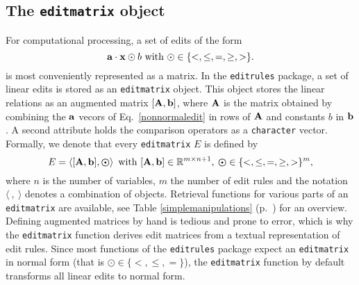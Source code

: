 \documentclass[10pt, fleqn, a4paper]{article}
\begin{document}
\subsection{The {\tt editmatrix} object}
For computational processing, a set of edits of the form 
\begin{equation}
{\bf a}\cdot{\bf x} \odot b\textrm{ with }\odot\in\{<,\leq,=,\geq,>\}.
\label{nonnormaledit}
\end{equation}
is most conveniently represented as a matrix.  In the {\tt editrules} package,
a set of linear edits is stored as an {\tt editmatrix} object.  This 
object stores the linear relations as an augmented matrix $[{\bf
A},{\bf b}]$, where $\bf A$ is the matrix obtained by combining the  ${\bf a}$
vecors of Eq.\ \eqref{nonnormaledit} in rows of $\bf A$ and constants  $b$ in $\bf b$. A
second attribute holds the comparison operators as a {\tt character} vector.
Formally, we denote that every {\tt editmatrix} $E$ is defined by
\begin{equation}
E = \left\langle [\mathbf{A},\mathbf{b}],\boldsymbol{\odot}\right\rangle 
\textrm{ with } [{\bf A},{\bf b}]\in \mathbb{R}^{m\times{n+1}},\:
\boldsymbol{\odot}\in\{<,\leq,=,\geq,>\}^{m},
\label{editset}
\end{equation}
where $n$ is the number of variables, $m$ the number of edit rules and the notation
$\langle \:,\:\rangle$ denotes a combination of objects.
Retrieval functions for various parts of an {\tt editmatrix} are available, 
see Table \ref{simplemanipulations} (p.\ \pageref{simplemanipulations}) for an overview.
Defining augmented matrices by hand is tedious and prone to error, which is why
the {\tt editmatrix} function  derives edit matrices from a textual representation
of edit rules. Since most functions of the {\tt editrules} package expect an 
{\tt editmatrix} in normal form (that is $\boldsymbol{\odot}\in\{<,\leq,=\}$), the {\tt editmatrix}
function by default transforms all linear edits to normal form.
\end{document}
